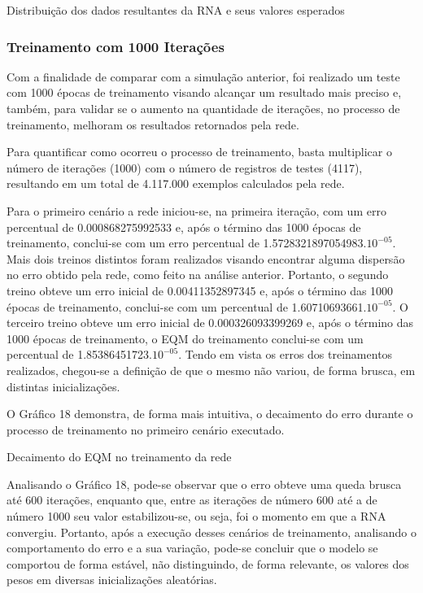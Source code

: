 \begin{grafico}[h]
	\centering
	\caption{Distribuição dos dados resultantes da RNA e seus valores esperados}
	\label{lingua}
\end{grafico}

\subsubsection{Treinamento com 1000 Iterações}	
Com a finalidade de comparar com a simulação anterior, foi realizado um teste com 1000 épocas de treinamento visando alcançar um resultado mais preciso e, também, para validar se o aumento na quantidade de iterações, no processo de treinamento, melhoram os resultados retornados pela rede.

Para quantificar como ocorreu o processo de treinamento, basta multiplicar o número de iterações (1000) com o número de registros de testes (4117), resultando em um total de 4.117.000 exemplos calculados pela rede.

Para o primeiro cenário a rede iniciou-se, na primeira iteração, com um erro percentual de 0.000868275992533 e, após o término das 1000 épocas de treinamento, conclui-se com um erro percentual de 1.5728321897054983.$10^{-05}$. Mais dois treinos distintos foram realizados visando encontrar alguma dispersão no erro obtido pela rede, como feito na análise anterior. Portanto, o segundo treino obteve um erro inicial de 0.00411352897345 e, após o término das 1000 épocas de treinamento, conclui-se com um percentual de 1.60710693661.$10^{-05}$. O terceiro treino obteve um erro inicial de 0.000326093399269 e, após o término das 1000 épocas de treinamento, o EQM do treinamento conclui-se com um percentual de 1.85386451723.$10^{-05}$. Tendo em vista os erros dos treinamentos realizados, chegou-se a definição de que o mesmo não variou, de forma brusca, em distintas inicializações.

O Gráfico 18 demonstra, de forma mais intuitiva, o decaimento do erro durante o processo de treinamento no primeiro cenário executado.

\begin{grafico}[h]
	\centering
	\caption{Decaimento do EQM no treinamento da rede}
	\label{lingua}
\end{grafico}

Analisando o Gráfico 18, pode-se observar que o erro obteve uma queda brusca até 600 iterações, enquanto que, entre as iterações de número 600 até a de número 1000 seu valor estabilizou-se, ou seja, foi o momento em que a RNA convergiu. Portanto, após a execução desses cenários de treinamento, analisando o comportamento do erro e a sua variação, pode-se concluir que o modelo se comportou de forma estável, não distinguindo, de forma relevante, os valores dos pesos em diversas inicializações aleatórias.

